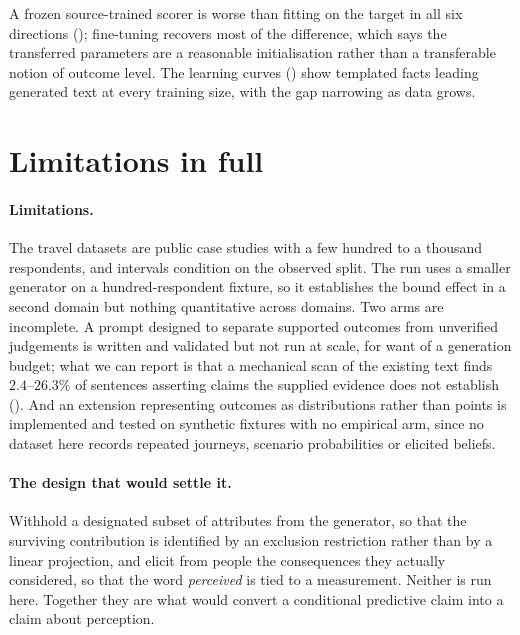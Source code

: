 \begin{table}[t]
\caption{Learning curves on  (seed 7), subsampling whole households.}
\label{tab:curve}
\centering\small

\end{table}

A frozen source-trained scorer is worse than fitting on the target in all six directions
(); fine-tuning recovers most of the difference, which says the transferred
parameters are a reasonable initialisation rather than a transferable notion of outcome level.
The learning curves () show templated facts leading generated text at every
training size, with the gap narrowing as data grows.

\section{Limitations in full}
\label{app:limits}

\paragraph{Limitations.} The travel datasets are public case studies with a few hundred to a
thousand respondents, and intervals condition on the observed split. The  run
uses a smaller generator on a hundred-respondent fixture, so it establishes the bound effect in
a second domain but nothing quantitative across domains. Two arms are incomplete. A prompt
designed to separate supported outcomes from unverified judgements is written and validated but
not run at scale, for want of a generation budget; what we can report is that a mechanical scan
of the existing text finds $2.4$--$26.3\%$ of sentences asserting claims the supplied evidence
does not establish (). And an extension representing outcomes as distributions
rather than points is implemented and tested on synthetic fixtures with no empirical arm, since
no dataset here records repeated journeys, scenario probabilities or elicited beliefs.

\paragraph{The design that would settle it.} Withhold a designated subset of attributes from
the generator, so that the surviving contribution is identified by an exclusion restriction
rather than by a linear projection, and elicit from people the consequences they actually
considered, so that the word \emph{perceived} is tied to a measurement. Neither is run here.
Together they are what would convert a conditional predictive claim into a claim about
perception.

